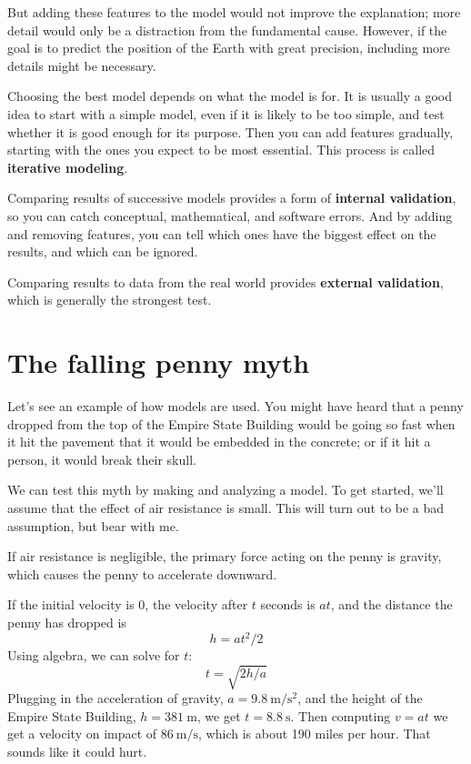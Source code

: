 \documentclass[12pt]{book}
\theoremstyle{exercise}
\begin{document}

But adding these features to the model would not improve the explanation; more detail would only be a distraction from the fundamental cause.  However, if the goal is to predict the position of the Earth with great precision, including more details might be necessary.  

Choosing the best model depends on what the model is for.  It is usually a good idea to start with a simple model, even if it is likely to be too simple, and test whether it is good enough for its purpose.  Then you can add features gradually, starting with the ones you expect to be most essential.  This process is called {\bf iterative modeling}.

Comparing results of successive models provides a form of {\bf internal validation}, so you can catch conceptual, mathematical, and software errors.  And by adding and removing features, you can tell which ones have the biggest effect on the results, and which can be ignored.


Comparing results to data from the real world provides {\bf external validation}, which is generally the strongest test.


\section{The falling penny myth}
\label{penny}

Let's see an example of how models are used.  You might have heard that a penny dropped from the top of the Empire State Building would be going so fast when it hit the pavement that it would be embedded in the concrete; or if it hit a person, it would break their skull.


We can test this myth by making and analyzing a model.  To get started, we'll assume that the effect of air resistance is small.  This will turn out to be a bad assumption, but bear with me.

If air resistance is negligible, the primary force acting on the penny is gravity, which causes the penny to accelerate downward.

If the initial velocity is 0, the velocity after $t$ seconds is $a t$, and the distance the penny has dropped is
%
\[ h = a t^2 / 2 \]
%
Using algebra, we can solve for $t$:
%
\[ t = \sqrt{ 2 h / a} \]
%
Plugging in the acceleration of gravity, $a = \SI{9.8}{\meter\per\second\squared}$, and the height of the Empire State Building, $h=\SI{381}{\meter}$, we get $t = \SI{8.8}{\second}$.  Then computing $v = a t$ we get a velocity on impact of $\SI{86}{\meter\per\second}$, which is about 190 miles per hour.  That sounds like it could hurt.
\end{document}
